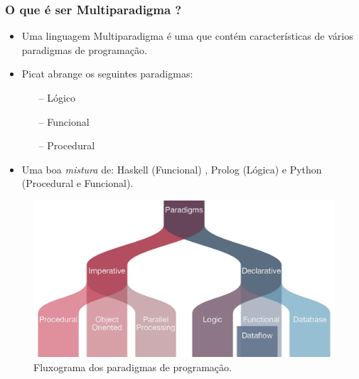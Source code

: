 
\begin{frame}
    \frametitle{O que é ser Multiparadigma ?}

    \begin{itemize}
    
      \item Uma linguagem Multiparadigma é uma que contém características  de vários paradigmas de 
      programação.
      
      \item Picat abrange os seguintes paradigmas:
      
      \begin{itemize}
      	\item[--] Lógico
      	\item[--] Funcional
      	\item[--] Procedural
      \end{itemize}
      
      \item Uma boa \textit{mistura} de: Haskell (Funcional) , Prolog (Lógica) e 
      Python (Procedural e Funcional).
      
    \end{itemize}
      
      \begin{figure}
        \centering
        \includegraphics[width=.5\textwidth] {figures/Paradigma_Flow.png}
        \caption{Fluxograma dos paradigmas de programação.}
        \label{Fluxograma dos Paradigmas}
      \end{figure}
      

\end{frame}

